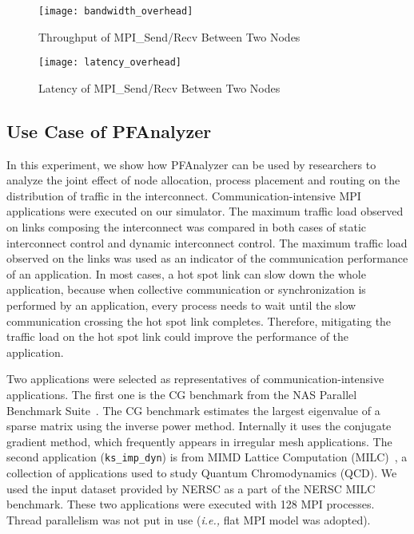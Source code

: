 \begin{figure}
    \centering
    \texttt{[image: bandwidth\_overhead]}
    \caption{Throughput of MPI\_Send/Recv Between Two Nodes}%
    \label{fig:bandwidth-overhead}
\end{figure}

\begin{figure}
    \centering
    \texttt{[image: latency\_overhead]}
    \caption{Latency of MPI\_Send/Recv Between Two Nodes}%
    \label{fig:latency-overhead}
\end{figure}

\subsection{Use Case of PFAnalyzer}\label{sec:ii-simulation-results}

In this experiment, we show how PFAnalyzer can be used by researchers to
analyze the joint effect of node allocation, process placement and routing
on the distribution of traffic in the interconnect.
Communication-intensive MPI applications were
executed on our simulator. The maximum traffic load observed on links
composing the interconnect was compared in both cases of static
interconnect control and dynamic interconnect control. The maximum
traffic load observed on the links was used as an indicator of the
communication performance of an application. In most cases, a hot spot
link can slow down the whole application, because when collective
communication or synchronization is performed by an application, every
process needs to wait until the slow communication crossing the hot spot
link completes. Therefore, mitigating the traffic load on the hot spot
link could improve the performance of the application.

Two applications were selected as representatives of
communication-intensive applications. The first one is the CG benchmark
from the NAS Parallel Benchmark Suite~\autocite{Bailey1991}. The CG
benchmark estimates the largest eigenvalue of a sparse matrix using the
inverse power method. Internally it uses the conjugate gradient method,
which frequently appears in irregular mesh applications. The second
application (\lstinline!ks_imp_dyn!) is from MIMD
Lattice Computation (MILC)~\autocite{milc}, a collection of applications
used to study Quantum Chromodynamics (QCD). We used the input dataset
provided by NERSC as a part of the NERSC MILC benchmark. These two
applications were executed with 128 MPI processes. Thread parallelism
was not put in use (\emph{i.e.,} flat MPI model was adopted).

